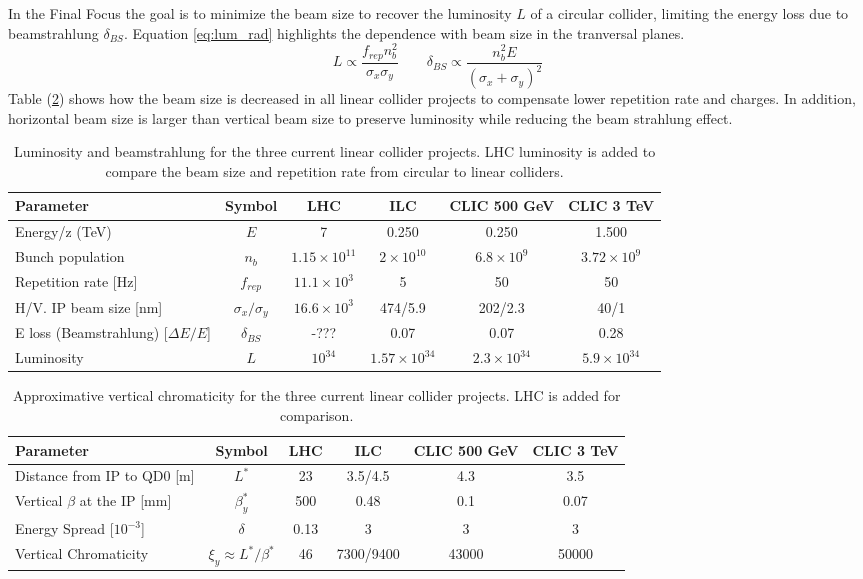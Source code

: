 In the Final Focus the goal is to minimize the beam size to recover the luminosity $L$ of a circular collider, limiting the energy loss due to beamstrahlung $\delta_{BS}$. Equation \ref{eq:lum_rad} highlights the dependence with beam size in the tranversal planes.
\begin{equation}
 L \propto \frac{f_{rep}n_b^2}{\sigma_x\sigma_y}\qquad\delta_{BS}\propto\frac{n_b^2E}{(\sigma_x+\sigma_y)^2}\label{eq:lum_rad}
\end{equation}
Table (\ref{t:lum_rad}) shows how the beam size is decreased in all linear collider projects to compensate lower repetition rate and charges. In addition, horizontal beam size is larger than vertical beam size to preserve luminosity while reducing the beam strahlung effect.\par
\begin{table}[!htb]
{\scriptsize
\centering
\begin{tabular}{|l|c||c|c|c|c|}\hline
Parameter & Symbol & LHC & ILC & CLIC 500 GeV& CLIC 3 TeV\\\hline\hline
Energy/z (TeV) & $E$& 7& 0.250 & 0.250 & 1.500\\
Bunch population & $n_b$ &$1.15\times10^{11}$&$2\times10^{10}$&$6.8\times10^9$&$3.72\times10^9$\\
Repetition rate [Hz] &$f_{rep}$& $11.1\times10^{3}$&5 &50&50\\
H/V. IP beam size [nm] & $\sigma_x/\sigma_y$&$16.6\times10^{3}$&474/5.9&202/2.3&40/1\\\hline
E loss (Beamstrahlung) [$\Delta E/E$] &$\delta_{BS}$&-???&0.07&0.07&0.28\\
Luminosity &$L$& $10^{34}$ &$1.57\times10^{34}$ & $2.3\times10^{34}$&$5.9\times10^{34}$\\\hline
\end{tabular}\caption{Luminosity and beamstrahlung for the three current linear collider projects. LHC luminosity is added to compare the beam size and repetition rate from circular to linear colliders.}\label{t:lum_rad}
}
\end{table}


\begin{table}[!htb]
\scriptsize
\centering
\begin{tabular}{|l|c||c|c|c|c|}\hline
Parameter & Symbol & LHC & ILC & CLIC 500 GeV& CLIC 3 TeV\\\hline\hline
Distance from IP to QD0 [m] & $L^*$&23& 3.5/4.5 & 4.3 & 3.5\\
Vertical $\beta$ at the IP [mm] &$\beta_y^*$& 500 & 0.48 & 0.1&0.07\\
Energy Spread [$10^{-3}$]& $\delta$&0.13&3&3&3\\\hline
Vertical Chromaticity & $\xi_y\approx L^*/\beta^*$&46&7300/9400&43000&50000\\\hline
\end{tabular}\caption{Approximative vertical chromaticity for the three current linear collider projects. LHC is added for comparison.}\label{t:lum_rad}
\end{table}



